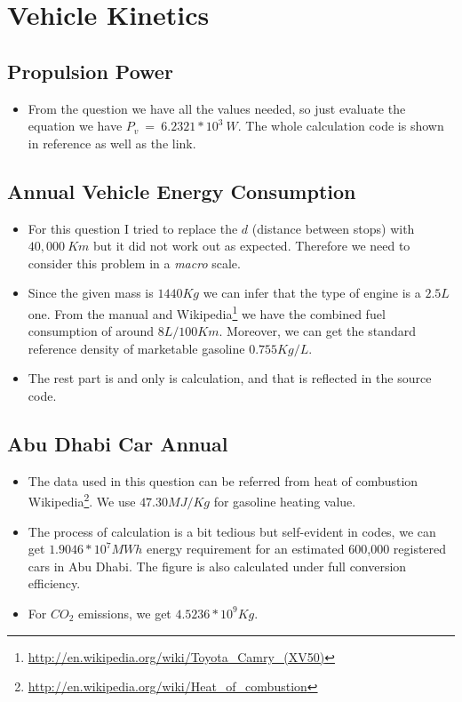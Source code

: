 \documentclass[12pt]{article}
\begin{document}
\section{Vehicle Kinetics}
\label{sec:vehicle-kinetics}

\subsection{Propulsion Power}
\label{sec:propulsion-power}

\begin{itemize}
\item From the question we have all the values needed, so just
  evaluate the equation we have $P_{v}~=~6.2321*10^{3}~W$. The whole
  calculation code is shown in reference as well as the link.
\end{itemize}

\subsection{Annual Vehicle Energy Consumption}
\label{sec:annu-vehicle-energy}
\begin{itemize}
\item For this question I tried to replace the $d$ (distance between
  stops) with $40,000~Km$ but it did not work out as
  expected. Therefore we need to consider this problem in a
  \emph{macro} scale.
\item Since the given mass is $1440Kg$ we can infer that the type of
  engine is a $2.5L$ one. From the manual and
  Wikipedia\footnote{\url{http://en.wikipedia.org/wiki/Toyota_Camry_(XV50)}}
  we have the combined fuel consumption of around
  $8L/100Km$. Moreover, we can get the standard reference density of
  marketable gasoline $0.755Kg/L$. 
\item The rest part is and only is calculation, and that is reflected
  in the source code.
\end{itemize}

\subsection{Abu Dhabi Car Annual}
\label{sec:abu-dhabi-car}

\begin{itemize}
\item The data used in this question can be referred from heat of
  combustion
  Wikipedia\footnote{\url{http://en.wikipedia.org/wiki/Heat_of_combustion}}. We
  use $47.30MJ/Kg$ for gasoline heating value.
\item The process of calculation is a bit tedious but self-evident in
  codes, we can get $1.9046*10^{7}MWh$ energy requirement for an
  estimated 600,000 registered cars in Abu Dhabi. The figure is also
  calculated under full  conversion efficiency.
\item For $CO_{2}$ emissions, we get $4.5236*10^{9}Kg$.
\end{itemize}
\end{document}
